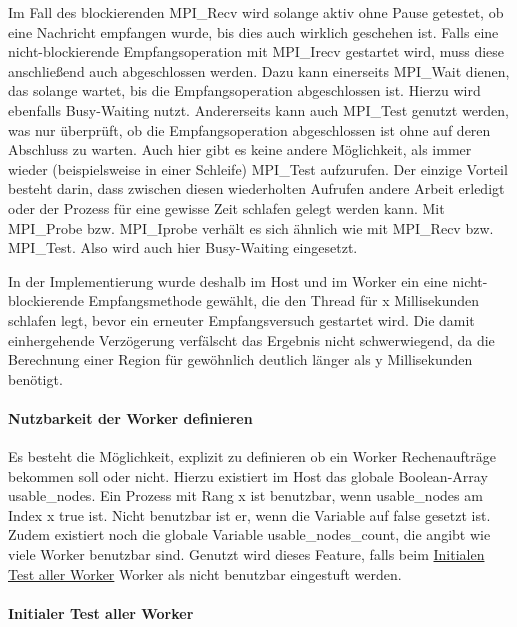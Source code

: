 Im Fall des blockierenden MPI\_Recv wird solange aktiv ohne Pause getestet, ob eine Nachricht empfangen wurde, bis dies auch wirklich geschehen ist. Falls eine nicht-blockierende Empfangsoperation mit MPI\_Irecv gestartet wird, muss diese anschließend auch abgeschlossen werden. Dazu kann einerseits MPI\_Wait dienen, das solange wartet, bis die Empfangsoperation abgeschlossen ist. Hierzu wird ebenfalls Busy-Waiting nutzt. Andererseits kann auch MPI\_Test genutzt werden, was nur überprüft, ob die Empfangsoperation abgeschlossen ist ohne auf deren Abschluss zu warten. Auch hier gibt es keine andere Möglichkeit, als immer wieder (beispielsweise in einer Schleife) MPI\_Test aufzurufen. Der einzige Vorteil besteht darin, dass zwischen diesen wiederholten Aufrufen andere Arbeit erledigt oder der Prozess für eine gewisse Zeit schlafen gelegt werden kann. Mit MPI\_Probe bzw. MPI\_Iprobe verhält es sich ähnlich wie mit MPI\_Recv bzw. MPI\_Test. Also wird auch hier Busy-Waiting eingesetzt.

In der Implementierung wurde deshalb im Host und im Worker ein eine nicht-blockierende Empfangsmethode gewählt, die den Thread für x Millisekunden schlafen legt, bevor ein erneuter Empfangsversuch gestartet wird. Die damit einhergehende Verzögerung verfälscht das Ergebnis nicht schwerwiegend, da die Berechnung einer Region für gewöhnlich deutlich länger als y Millisekunden benötigt.

\paragraph{Nutzbarkeit der Worker definieren}

Es besteht die Möglichkeit, explizit zu definieren ob ein Worker Rechenaufträge bekommen soll oder nicht. Hierzu existiert im Host das globale Boolean-Array usable\_nodes. Ein Prozess mit Rang x ist benutzbar, wenn usable\_nodes am Index x true ist. Nicht benutzbar ist er, wenn die Variable auf false gesetzt ist. Zudem existiert noch die globale Variable usable\_nodes\_count, die angibt wie viele Worker benutzbar sind. Genutzt wird dieses Feature, falls beim \hyperref[para:init_worker_test]{Initialen Test aller Worker} Worker als nicht benutzbar eingestuft werden.

\paragraph{Initialer Test aller Worker}\label{para:init_worker_test}

